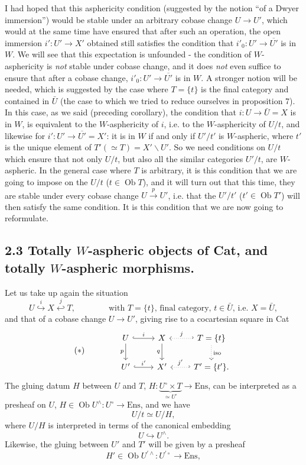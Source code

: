 \documentclass[11pt]{article}
\newcommand{\printedpage}[1]{\marginpar{\footnotesize p.~#1}}
\newcommand{\msp}[1]{\marginpar{\footnotesize [#1]}}
\newcommand{\Ob}{\operatorname{Ob}}
\begin{document}
I had hoped that this asphericity condition (suggested by the notion ``of a Dwyer immersion'') would be stable under an arbitrary cobase change $U\longrightarrow U'$, which would at the same time have ensured that after such an operation, the open immersion $i':U'\longrightarrow X'$ obtained still satisfies the condition that $i'_0:U'\longrightarrow\overline{U'}$ is in $W$. We will see that this expectation is unfounded - the condition of $W$-asphericity is \textit{not} stable under cobase change, and it does \textit{not} even suffice to ensure that after a cobase change, $i'_0:U'\longrightarrow\overline{U'}$ is
\printedpage{62}
in $W$. A stronger notion will be needed, which is suggested by the case where $T=\{t\}$ is the final category and contained in $\bar U$ (the case to which we tried to reduce ourselves in proposition 7). In this case, as we said (preceding corollary), the condition that $i:U\longrightarrow\bar U=X$ is in $W$, is equivalent to the $W$-asphericity of $i$, i.e. to the $W$-asphericity of $U/t$, and likewise for $i':U'\longrightarrow\overline{U'}=X'$: it is in $W$ if and only if $U'/t'$ is $W$-aspheric, where
\msp{page 87}
$t'$ is the unique element of $T'(\simeq T)=X'\backslash U'$. So we need conditions on $U/t$ which ensure that not only $U/t$, but also all the similar categories $U'/t$, are $W$-aspheric. In the general case where $T$ is arbitrary, it is this condition that we are going to impose on the $U/t$ ($t\in\Ob T$), and it will turn out that this time, they are stable under every cobase change $U\xrightarrow{p}U'$, i.e. that the $U'/t'$ ($t'\in\Ob T'$) will then satisfy the same condition. It is this condition that we are now going to reformulate.

\subsection*{2.3 Totally $W$-aspheric objects of \textnormal{Cat}, and totally $W$-aspheric morphisms.}

Let us take up again the situation
\[
U\overset{i}{\hookrightarrow}X\overset{j}{\hookleftarrow}T,\qquad\qquad\text{with }T=\{t\}\text{, final category, }t\in\bar U\text{, i.e. }X=\bar U,
\]
and that of a cobase change $U\longrightarrow U'$, giving rise to a cocartesian square in Cat
\[
(*)\qquad\qquad
\begin{tikzcd}
U \arrow[r, hook, "i"] \arrow[d, "p"'] & X \arrow[d, "q"'] & T=\{t\} \arrow[l, hook', dotted, "j"'] \arrow[d, dotted, "\mathrm{iso}"] \\
U' \arrow[r, hook, "i'"] & X' & T'=\{t'\}. \arrow[l, hook', dotted, "j'"']
\end{tikzcd}
\]
The gluing datum $H$ between $U$ and $T$, $H:\underbrace{U^\circ\times T}_{\simeq U^\circ}\longrightarrow\mathrm{Ens}$, can be interpreted as a presheaf on $U$, $H\in\Ob U^\wedge:U^\circ\longrightarrow\mathrm{Ens}$,
\msp{page 88}
and we have
\[
U/t\simeq U/H,
\]
where $U/H$ is interpreted in terms of the canonical embedding
\[
U\hookrightarrow U^\wedge.
\]
Likewise, the gluing between $U'$ and $T'$ will be given by a presheaf
\[
H'\in\Ob U^{\prime\wedge}:U^{\prime\circ}\longrightarrow\mathrm{Ens},
\]
\end{document}
